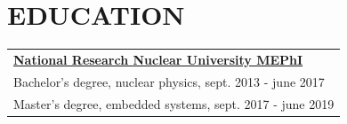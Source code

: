 \documentclass{anisyan-resume}
\begin{document}
	\section{\textbf{EDUCATION}}
	\vspace{10pt}
	\def\arraystretch{1.2}
	\begin{tabular}{ m{12cm} }
		\quad\href{https://eng.mephi.ru/}{\large \textbf{National Research Nuclear University MEPhI}} \\
		\vspace{5pt}
		\quad\normalsize{Bachelor's degree, nuclear physics, sept. 2013 - june 2017} \\
		\quad\normalsize{Master's degree, embedded systems, sept. 2017 - june 2019} \\
	\end{tabular}

	\vspace{5pt}
\end{document}
